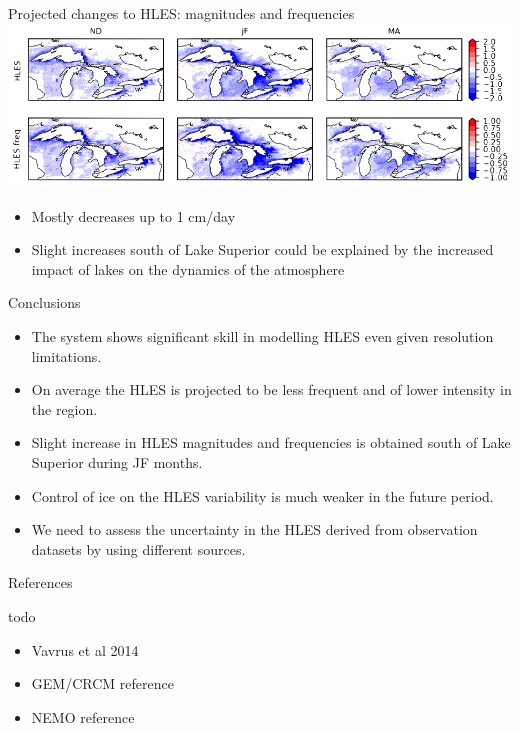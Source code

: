 \documentclass{beamer}
\begin{document}
  \begin{frame}{Projected changes to HLES: magnitudes and frequencies}
    \includegraphics[width=\textwidth]{projected_changes_to_hles.png}
    \begin{itemize}
      \item Mostly decreases up to 1 cm/day
      \item Slight increases south of Lake Superior could be explained by the increased impact of lakes on the dynamics of the atmosphere
    \end{itemize}
  \end{frame}



  \begin{frame}{Conclusions}
    \begin{itemize}
      \item The system shows significant skill in modelling HLES even given resolution limitations.
      \item On average the HLES is projected to be less frequent and of lower intensity in the region.
      \item Slight increase in HLES magnitudes and frequencies is obtained south of Lake Superior during JF months.
      \item Control of ice on the HLES variability is much weaker in the future period.
      \item We need to assess the uncertainty in the HLES derived from observation datasets by using different sources.
    \end{itemize}
  \end{frame}



  \begin{frame}{References}
    \nocite{*}
    
    


    todo
    \begin{itemize}
      \item Vavrus et al 2014
      \item GEM/CRCM reference
      \item NEMO reference
    \end{itemize}
  \end{frame}
\end{document}
